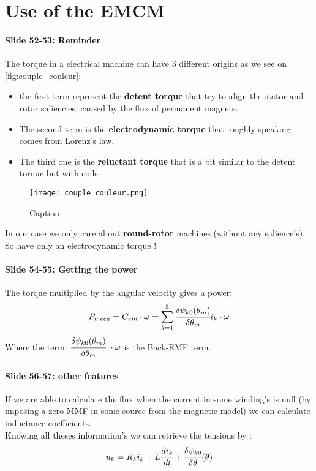 \section{Use of the EMCM}

\paragraph{Slide 52-53: Reminder}
The torque in a electrical machine can have 3 different origins as we see on \autoref{fig:couple_couleur}:
\begin{itemize}
    \item the first term represent the \textbf{detent torque} that try to align the stator and rotor saliencies, caused by the flux of permanent magnets. 
    \item The second term is the \textbf{electrodynamic torque} that roughly speaking  comes from Lorenz’s law.
    \item The third one is the \textbf{reluctant torque} that is a bit similar to the detent torque but with coils.
\end{itemize}
\begin{figure}[h!]
    \centering
    \texttt{[image: couple\_couleur.png]}
    \caption{Caption}
    \label{fig:couple_couleur}
\end{figure}

In our case we only care about \textbf{round-rotor} machines (without any salience's). So have only an electrodynamic torque !

\paragraph{Slide 54-55: Getting the power}
The torque multiplied by the angular velocity gives a power:
$$P_{meca} = C_{em} \cdot \omega = \sum_{k=1}^3 \cfrac{\delta \psi_{k0}(\theta_m)}{\delta \theta_m} i_k \cdot \omega $$
Where the term: $\cfrac{\delta \psi_{k0}(\theta_m)}{\delta \theta_m} \ \cdot \omega $ is the Back-EMF term.

\paragraph{Slide 56-57: other features}
If we are able to calculate the flux when the current in some winding's is null (by imposing a zero MMF in some source from the magnetic model) we can calculate inductance coefficients. \\
Knowing all theses information's we can retrieve the tensions by :
$$ u_k =  R_k i_k + L \cfrac{d i_k}{d t} + \cfrac{\delta \psi_{k0}}{\delta \theta} (\theta)$$


